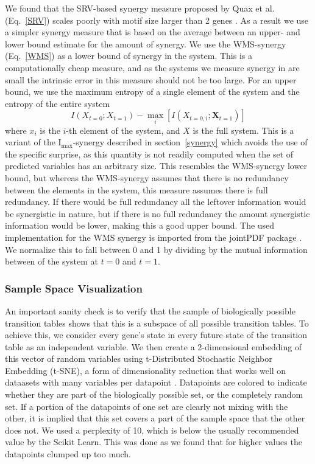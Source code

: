 \documentclass[../main.tex]{subfiles}
\begin{document}
We found that the SRV-based synergy measure proposed by Quax et al. (Eq.~\ref{SRV}) scales poorly with motif size larger than 2 genes \cite{quax2017quantifying}.
As a result we use a simpler synergy measure that is based on the average between an upper- and lower bound estimate for the amount of synergy.
We use the WMS-synergy (Eq.~\ref{WMS}) as a lower bound of synergy in the system.
This is a computationally cheap measure, and as the systems we measure synergy in are small the intrinsic error in this measure should not be too large.
For an upper bound, we use the maximum entropy of a single element of the system and the entropy of the entire system
%
\begin{equation}
I(X_{t=0}; X_{t=1}) - \max_i [I(X_{t=0,i};\mathbf{X}_{t=1})]
\end{equation}
%
where $x_i$ is the $i$-th element of the system, and $X$ is the full system.
This is a variant of the $\mathrm{I}_\mathrm{max}$-synergy described in section~\ref{synergy} which avoids the use of the specific surprise, as this quantity is not readily computed when the set of predicted variables has an arbitrary size.
This resembles the WMS-synergy lower bound, but whereas the WMS-synergy assumes that there is no redundancy between the elements in the system, this measure assumes there is full redundancy.
If there would be full redundancy all the leftover information would be synergistic in nature, but if there is no full redundancy the amount synergistic information would be lower, making this a good upper bound. %
The used implementation for the WMS synergy is imported from the jointPDF package \cite{jointpdf}.
We normalize this to fall between 0 and 1 by dividing by the mutual information between of the system at $t = 0$ and $t = 1$.

\subsubsection{Sample Space Visualization}

An important sanity check is to verify that the sample of biologically possible transition tables shows that this is a subspace of all possible transition tables.
To achieve this, we consider every gene's state in every future state of the transition table as an independent variable.
We then create a 2-dimensional embedding of this vector of random variables using t-Distributed Stochastic Neighbor Embedding (t-SNE), a form of dimensionality reduction that works well on dataasets with many variables per datapoint \cite{maaten2008visualizing}.
Datapoints are colored to indicate whether they are part of the biologically possible set, or the completely random set. %
If a portion of the datapoints of one set are clearly not mixing with the other, it is implied that this set covers a part of the sample space that the other does not.
We used a perplexity of 10, which is below the usually recommended value by the Scikit Learn.
This was done as we found that for higher values the datapoints clumped up too much.
\end{document}
